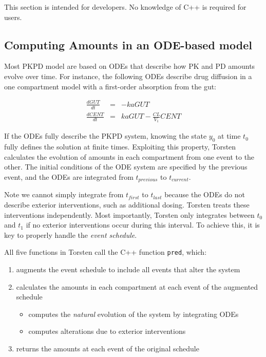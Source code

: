 \documentclass[11pt]{amsart}
\begin{document}
This section is intended for developers. No knowledge of C++ is required for users.


\subsection*{Computing Amounts in an ODE-based model}
Most PKPD model are based on ODEs that describe how PK and PD amounts evolve over time. For instance, the following ODEs describe drug diffusion in a one compartment model with a first-order absorption from the gut:

\begin{eqnarray*}
\frac{dGUT}{dt} &=& -kaGUT \\ 
\frac{dCENT}{dt} &=& kaGUT - \frac{CL}{V_{1}}CENT
\end{eqnarray*}

If the ODEs fully describe the PKPD system, knowing the state $y_0$ at time $t_0$ fully defines the solution at finite times. Exploiting this property, Torsten calculates the evolution of amounts in each compartment from one event to the other. The initial conditions of the ODE system are specified by the previous event, and the ODEs are integrated from $t_{previous} $ to $t_{current}$. 

Note we cannot simply integrate from $t_{first}$ to $t_{last}$ because the ODEs do not describe exterior interventions, such as additional dosing. Torsten treats these interventions independently. Most importantly, Torsten only integrates between $t_0$ and $t_1$ if no exterior interventions occur during this interval. To achieve this, it is key to properly handle the \textit{event schedule}. 

All five functions in Torsten call the C++ function \texttt{pred}, which:
\begin{enumerate}
  \item augments the event schedule to include all events that alter the system
  \item calculates the amounts in each compartment at each event of the augmented schedule
  \begin{itemize}
    \item computes the \textit{natural} evolution of the system by integrating ODEs
    \item computes alterations due to exterior interventions
  \end{itemize}
  \item returns the amounts at each event of the original schedule
\end{enumerate}
\end{document}
